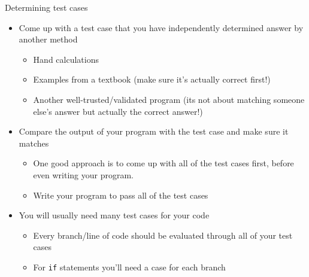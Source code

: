 \documentclass[11pt,professionalfonts]{beamer}
\begin{document}
\begin{frame}{Determining test cases}
    \begin{itemize}
        \item Come up with a test case that you have independently determined answer by another method
            \begin{itemize}
                \item Hand calculations
                \item Examples from a textbook (make sure it's actually correct first!)
                \item Another well-trusted/validated program (its not about matching someone else's answer but actually the correct answer!)
            \end{itemize}
        \item Compare the output of your program with the test case and make sure it matches
            \begin{itemize}
                \item One good approach is to come up with all of the test cases first, before even writing your program.
                \item Write your program to pass all of the test cases
            \end{itemize}
        \item You will usually need many test cases for your code
            \begin{itemize}
                \item Every branch/line of code should be evaluated through all of your test cases
                \item For \texttt{if} statements you'll need a case for each branch
            \end{itemize}
    \end{itemize}
\end{frame}
\end{document}

